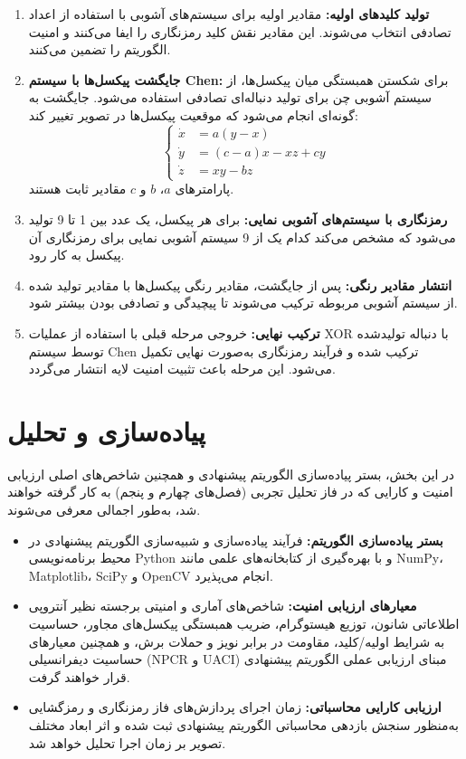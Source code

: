\documentclass[a4paper,12pt]{report}
\renewcommand{\%}{\lr{\oldpercent}}
\providecommand{\lr}[1]{#1}
\begin{document}
\begin{enumerate}
    \item \textbf{تولید کلیدهای اولیه:} مقادیر اولیه برای سیستم‌های آشوبی با استفاده از اعداد تصادفی انتخاب می‌شوند. این مقادیر نقش کلید رمزنگاری را ایفا می‌کنند و امنیت الگوریتم را تضمین می‌کنند.
    \item \textbf{جایگشت پیکسل‌ها با سیستم \lr{Chen}:} برای شکستن همبستگی میان پیکسل‌ها، از سیستم آشوبی چن برای تولید دنباله‌ای تصادفی استفاده می‌شود. جایگشت به گونه‌ای انجام می‌شود که موقعیت پیکسل‌ها در تصویر تغییر کند:
    \begin{equation}
    \left\{ \begin{aligned}
        \dot{x} &= a(y - x) \\
        \dot{y} &= (c - a)x - xz + cy \\
        \dot{z} &= xy - bz
    \end{aligned} \right.
    \end{equation}
    پارامترهای $a$، $b$ و $c$ مقادیر ثابت هستند.
    \item \textbf{رمزنگاری با سیستم‌های آشوبی نمایی:} برای هر پیکسل، یک عدد بین 1 تا 9 تولید می‌شود که مشخص می‌کند کدام یک از 9 سیستم آشوبی نمایی برای رمزنگاری آن پیکسل به کار رود.
    \item \textbf{انتشار مقادیر رنگی:} پس از جایگشت، مقادیر رنگی پیکسل‌ها با مقادیر تولید شده از سیستم آشوبی مربوطه ترکیب می‌شوند تا پیچیدگی و تصادفی بودن بیشتر شود.
    \item \textbf{ترکیب نهایی:} خروجی مرحله قبلی با استفاده از عملیات \lr{XOR} با دنباله تولیدشده توسط سیستم \lr{Chen} ترکیب شده و فرآیند رمزنگاری به‌صورت نهایی تکمیل می‌شود. این مرحله باعث تثبیت امنیت لایه انتشار می‌گردد.
\end{enumerate}

\section{پیاده‌سازی و تحلیل}
در این بخش، بستر پیاده‌سازی الگوریتم پیشنهادی و همچنین شاخص‌های اصلی ارزیابی امنیت و کارایی که در فاز تحلیل تجربی (فصل‌های چهارم و پنجم) به کار گرفته خواهند شد، به‌طور اجمالی معرفی می‌شوند.

\begin{itemize}
    \item \textbf{بستر پیاده‌سازی الگوریتم:} فرآیند پیاده‌سازی و شبیه‌سازی الگوریتم پیشنهادی در محیط برنامه‌نویسی \lr{Python} و با بهره‌گیری از کتابخانه‌های علمی مانند \lr{NumPy}، \lr{Matplotlib}، \lr{SciPy} و \lr{OpenCV} انجام می‌پذیرد.
    \item \textbf{معیارهای ارزیابی امنیت:} شاخص‌های آماری و امنیتی برجسته نظیر آنتروپی اطلاعاتی شانون، توزیع هیستوگرام، ضریب همبستگی پیکسل‌های مجاور، حساسیت به شرایط اولیه/کلید، مقاومت در برابر نویز و حملات برش، و همچنین معیارهای حساسیت دیفرانسیلی (\lr{NPCR} و \lr{UACI}) مبنای ارزیابی عملی الگوریتم پیشنهادی قرار خواهند گرفت.
    \item \textbf{ارزیابی کارایی محاسباتی:} زمان اجرای پردازش‌های فاز رمزنگاری و رمزگشایی به‌منظور سنجش بازدهی محاسباتی الگوریتم پیشنهادی ثبت شده و اثر ابعاد مختلف تصویر بر زمان اجرا تحلیل خواهد شد.
\end{itemize}
\end{document}
